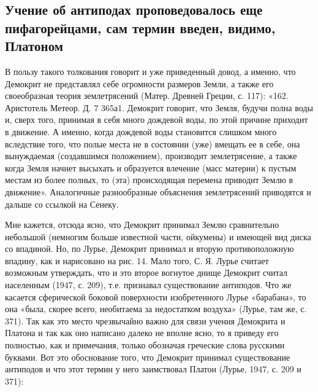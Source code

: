 \subsection{Учение об антиподах проповедовалось еще пифагорейцами, сам
термин введен, видимо, Платоном}

В пользу такого толкования говорит и уже приведенный довод, а
именно, что Демокрит не представлял себе огромности размеров Земли, а
также его своеобразная теория землетрясений (Матер. Древней Греции, с.
117): «162. Аристотель Метеор. Д. 7 365а1. Демокрит говорит, что
Земля, будучи полна воды и, сверх того, принимая в себя много дождевой
воды, по этой причине приходит в движение. А именно, когда дождевой
воды становится слишком много вследствие того, что полые места не в
состоянии (уже) вмещать ее в себе, она вынуждаемая (создавшимся
положением), производит землетрясение, а также когда Земля начнет
высыхать и образуется влечение (масс материи) к пустым местам из более
полных, то (эта) происходящая перемена приводит
Землю в движение». Аналогичные разнообразные объяснения землетрясений
приводятся и дальше со ссылкой на Сенеку.

Мне кажется, отсюда ясно, что Демокрит принимал Землю сравнительно
небольшой (немногим больше известной части, ойкумены) и имеющей вид
диска со впадиной. Но, по Лурье, Демокрит принимал и вторую
противоположную впадину, как и нарисовано на рис. 14. Мало того, С. Я.
Лурье считает возможным утверждать, что и это второе вогнутое днище
Демокрит считал населенным (1947, с. 209), т.е. признавал
существование антиподов. Что же касается сферической боковой
поверхности изобретенного Лурье «барабана», то она «была, скорее
всего, необитаема за недостатком воздуха» (Лурье, там же, с. 371). Так
как это место чрезвычайно важно для связи учения Демокрита и Платона и
так как оно написано далеко не вполне ясно, то я приведу его
полностью, как и примечания, только обозначая греческие слова русскими
буквами. Вот это обоснование того, что Демокрит принимал существование
антиподов и что этот термин у него заимствовал Платон (Лурье, 1947, с.
209 и 371):


